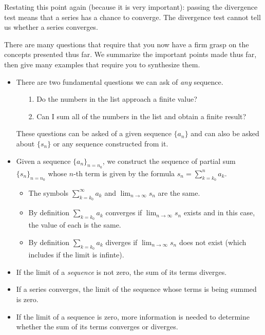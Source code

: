 \documentclass{ximera}
\begin{document}
Restating this point again (because it is very important): passing the divergence test 
means that a series has a chance to converge.  The divergence test cannot tell us 
whether a series converges.

%
%
There are many questions that require that you now have a firm grasp on the concepts presented thus far.  We summarize the important points made thus far, then give many examples that require you to synthesize them.

\begin{itemize}
\item There are two fundamental questions we can ask of \emph{any} sequence.
\begin{itemize}
\item[1.] Do the numbers in the list approach a finite value?
\item[2.] Can I sum all of the numbers in the list and obtain a finite result?
\end{itemize}
These questions can be asked of a given sequence $\{a_n\}$ and can also be asked about $\{s_n\}$ or any sequence constructed from it.
\item Given a sequence $\{a_n\}_{n=n_0}$, we construct the sequence of partial sum $\{s_n\}_{n=n_0}$ whose $n$-th term is given by the formula $s_n = \sum_{k=k_0}^n a_k$.
\begin{itemize}
\item The symbols $\sum_{k=k_0}^{\infty} a_k$ and $\lim_{n \to \infty} s_n$ are the same.
\item By definition $\sum_{k=k_0} a_k$ converges if $\lim_{n \to \infty} s_n$ exists and in this case, the value of each is the same.
\item By definition $\sum_{k=k_0} a_k$ diverges if $\lim_{n \to \infty} s_n$ does not exist (which includes if the limit is infinte). 
\end{itemize}
\item If the limit of a \emph{sequence} is not zero, the sum of its terms diverges.
\item If a series converges, the limit of the sequence whose terms is being summed is zero.
\item If the limit of a sequence is zero, more information is needed to determine whether the sum of its terms converges or diverges.
\end{itemize}
\end{document}
